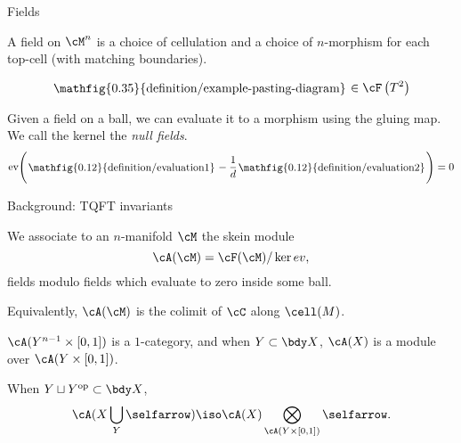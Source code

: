 \documentclass[beamer, compress]{beamer}
\begin{document}
\newcommand{\roundframe}[1]{\begin{tikzpicture}[baseline=-2pt]\node[rectangle,inner sep=1pt,rounded corners,fill=white] {#1};\end{tikzpicture}}

\begin{frame}{Fields}
\begin{block}{}
A field on $\cM^n$ is a choice of cellulation and a choice of $n$-morphism for each top-cell (with matching boundaries).
\end{block}
\begin{example}[$\cC = \text{TL}_d$ the Temperley-Lieb category]
$$\roundframe{\mathfig{0.35}{definition/example-pasting-diagram}} \in \cF\left(T^2\right)$$
\end{example}
\begin{block}{}
Given a field on a ball, we can evaluate it to a morphism using the gluing map. We call the kernel the \emph{null fields}.
\vspace{-3mm}
$$\text{ev}\Bigg(\roundframe{\mathfig{0.12}{definition/evaluation1}} - \frac{1}{d}\roundframe{\mathfig{0.12}{definition/evaluation2}}\Bigg) = 0$$
\end{block}
\end{frame}

\begin{frame}{Background: TQFT invariants}
\begin{defn}
We associate to an $n$-manifold $\cM$ the skein module
\vspace{-1mm}
$$\cA(\cM) = \cF(\cM) / \ker{ev},\vspace{-1mm}$$
fields modulo fields which evaluate to zero inside some ball.
\end{defn}
Equivalently, $\cA(\cM)$ is the colimit of $\cC$ along $\cell(M)$.

\vspace{4mm}
$\cA(Y^{n-1} \times [0,1])$ is a $1$-category, and when $Y \subset \bdy X$, $\cA(X)$ is a module over $\cA(Y \times [0,1])$.
\begin{thm}
When $Y \sqcup Y^{\text{op}} \subset \bdy X$,
\vspace{-1mm}
\[
	\cA(X \bigcup_Y \selfarrow) \iso \cA(X) \bigotimes_{\cA(Y \times [0,1])} \selfarrow.
\]
\end{thm}
\end{frame}
\end{document}
